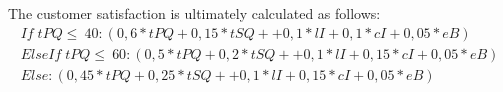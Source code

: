 The customer satisfaction is ultimately calculated as follows:
    \begin{equation}
    \begin{aligned}
    If \; tPQ \leq \ 40: (0,6*tPQ + 0,15*tSQ + + 0,1*lI + 0,1*cI + 0,05*eB)\\
    ElseIf \; tPQ \leq \ 60: (0,5*tPQ + 0,2*tSQ + + 0,1*lI + 0,15*cI + 0,05*eB)\\
    Else: (0,45*tPQ + 0,25*tSQ + + 0,1*lI + 0,15*cI + 0,05*eB)
    \end{aligned}
    \end{equation}
    
    



